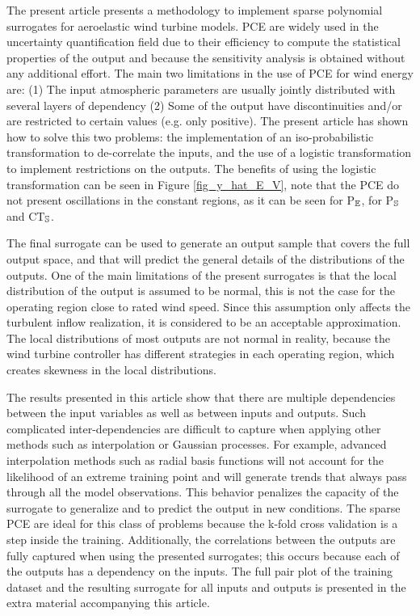 \documentclass[preprint,12pt]{elsarticle}
\begin{document}
The present article presents a methodology to implement sparse polynomial surrogates for aeroelastic wind turbine models. PCE are widely used in the uncertainty quantification field due to their efficiency to compute the statistical properties of the output and because the sensitivity analysis is obtained without any additional effort. The main two limitations in the use of PCE for wind energy are: (1) The input atmospheric parameters are usually jointly distributed with several layers of dependency (2) Some of the output have discontinuities and/or are restricted to certain values (e.g. only positive). The present article has shown how to solve this two problems: the implementation of an iso-probabilistic transformation to de-correlate the inputs, and  the use of a logistic transformation to implement restrictions on the outputs. The benefits of using the logistic transformation can be seen in Figure \ref{fig_y_hat_E_V}, note that the PCE do not present oscillations in the constant regions, as it can be seen for P$_{\mathbb{E}}$, for P$_{\mathbb{S}}$ and CT$_{\mathbb{S}}$.

The final surrogate can be used to generate an output sample that covers the full output space, and that will predict the general details of the distributions of the outputs. One of the main limitations of the present surrogates is that the local distribution of the output is assumed to be normal, this is not the case for the operating region close to rated wind speed. Since this assumption only affects the turbulent inflow realization, it is considered to be an acceptable approximation. The local distributions of most outputs are not normal in reality, because the wind turbine controller has different strategies in each operating region, which creates skewness in the local distributions.

The results presented in this article show that there are multiple dependencies between the input variables as well as between inputs and outputs. Such complicated inter-dependencies are difficult to capture when applying other methods such as interpolation or Gaussian processes. For example, advanced interpolation methods such as radial basis functions will not account for the likelihood of an extreme training point and will generate trends that always pass through all the model observations. This behavior penalizes the capacity of the surrogate to generalize and to predict the output in new conditions. The sparse PCE are ideal for this class of problems because the k-fold cross validation is a step inside the training. Additionally, the correlations between the outputs are fully captured when using the presented surrogates; this occurs because each of the outputs has a dependency on the inputs. The full pair plot of the training dataset and the resulting surrogate for all inputs and outputs is presented in the extra material accompanying this article. %
\end{document}

